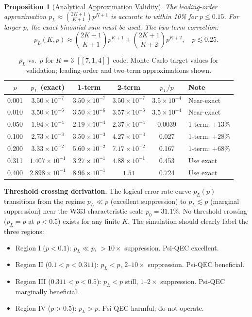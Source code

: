 \documentclass[11pt]{article}
\newtheorem{proposition}[theorem]{Proposition}
\theoremstyle{definition}
\theoremstyle{remark}
\begin{document}
\begin{proposition}[Analytical Approximation Validity]
\label{prop:analytical-approx}
The leading-order approximation $p_L \approx \binom{2K+1}{K+1}p^{K+1}$
is accurate to within 10\% for $p \leq 0.15$.  For larger $p$, the exact
binomial sum must be used.  The two-term correction:
\begin{equation}
  p_L(K,p) \approx \binom{2K+1}{K+1}p^{K+1} + \binom{2K+1}{K+2}p^{K+2},
  \quad p \lesssim 0.25.
  \label{eq:two-term}
\end{equation}
\end{proposition}

\begin{table}[h]
\centering
\caption{$p_L$ vs.\ $p$ for $K=3$ $[[7,1,4]]$ code.  Monte Carlo target
  values for validation; leading-order and two-term approximations shown.}
\label{tab:pL-curve}
\begin{tabular}{@{}cccccl@{}}
\toprule
$p$ & $p_L$ (exact) & 1-term & 2-term & $p_L/p$ & Note \\
\midrule
0.001 & $3.50\times10^{-7}$ & $3.50\times10^{-7}$ & $3.50\times10^{-7}$ & $3.5\times10^{-4}$ & Near-exact \\
0.010 & $3.50\times10^{-6}$ & $3.50\times10^{-6}$ & $3.57\times10^{-6}$ & $3.5\times10^{-4}$ & Near-exact \\
0.050 & $1.94\times10^{-4}$ & $2.19\times10^{-4}$ & $2.37\times10^{-4}$ & 0.0039 & 1-term: $+13\%$ \\
0.100 & $2.73\times10^{-3}$ & $3.50\times10^{-3}$ & $4.27\times10^{-3}$ & 0.027 & 1-term: $+28\%$ \\
0.200 & $3.33\times10^{-2}$ & $5.60\times10^{-2}$ & $7.17\times10^{-2}$ & 0.167 & 1-term: $+68\%$ \\
0.311 & $1.407\times10^{-1}$ & $3.27\times10^{-1}$ & $4.88\times10^{-1}$ & 0.453 & Use exact \\
0.400 & $2.898\times10^{-1}$ & $8.96\times10^{-1}$ & $1.51$ & 0.724 & Use exact \\
\bottomrule
\end{tabular}
\end{table}

\textbf{Threshold crossing derivation.}  The logical error rate curve $p_L(p)$
transitions from the regime $p_L \ll p$ (excellent suppression) to $p_L \lesssim p$
(marginal suppression) near the W3i3 characteristic scale $p_0 = 31.1\%$.
No threshold crossing ($p_L = p$ at $p < 0.5$) exists for any finite $K$.
The simulation should clearly label the three regions:
\begin{itemize}
  \item Region I ($p < 0.1$): $p_L \ll p$, $>10\times$ suppression.  Psi-QEC excellent.
  \item Region II ($0.1 < p < 0.311$): $p_L < p$, $2\text{--}10\times$ suppression.
    Psi-QEC beneficial.
  \item Region III ($0.311 < p < 0.5$): $p_L < p$ still, $1\text{--}2\times$ suppression.
    Psi-QEC marginally beneficial.
  \item Region IV ($p > 0.5$): $p_L > p$.  Psi-QEC harmful; do not operate.
\end{itemize}
\end{document}
